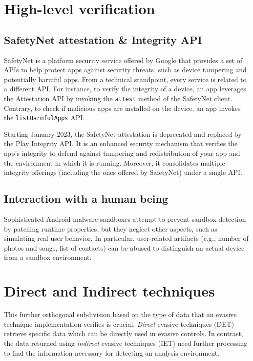 \section{High-level verification}

\subsection{SafetyNet attestation \& Integrity API}
SafetyNet is a platform security service offered by Google that provides a set of APIs to help protect apps against security threats, such as device tampering and potentially harmful apps.
From a technical standpoint, every service is related to a different API.
For instance, to verify the integrity of a device, an app leverages the Attestation API by invoking the \texttt{attest} method of the SafetyNet client.
Contrary, to check if malicious apps are installed on the device, an app invokes the \texttt{listHarmfulApps} API.

Starting January 2023, the SafetyNet attestation is deprecated and replaced by the Play Integrity API.
It is an enhanced security mechanism that verifies the app's integrity to defend against tampering and redistribution of your app and the environment in which it is running.
Moreover, it consolidates multiple integrity offerings (including the ones offered by SafetyNet) under a single API.

\subsection{Interaction with a human being}
Sophisticated Android malware sandboxes attempt to prevent sandbox detection by patching runtime properties, but they neglect other aspects, such as simulating real user behavior.
In particular, user-related artifacts (e.g., number of photos and songs, list of contacts) can be abused to distinguish an actual device from a sandbox environment.


\section{Direct and Indirect techniques}
This further orthogonal subdivision based on the type of data that an evasive technique implementation verifies is crucial. 
\emph{Direct} evasive techniques (DET) retrieve specific data which can be directly used in evasive controls. In contrast, the data returned using \emph{indirect} evasive techniques (IET) need further processing to find the information necessary for detecting an analysis environment.

